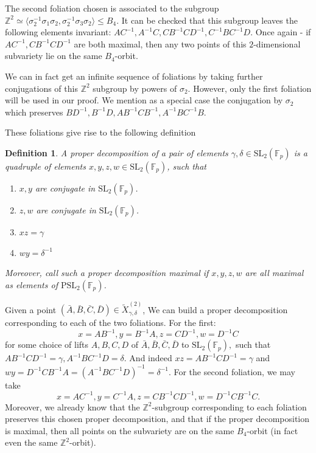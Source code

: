 \documentclass[letterpaper]{amsart}
\newtheorem{definition}[theorem]{Definition}
\begin{document}
The second foliation chosen is associated to the subgroup $\mathbb{Z}^2 \simeq \langle \sigma_2^{-1} \sigma_1 \sigma_2, \sigma_2^{-1} \sigma_3 \sigma_2 \rangle \leq B_4$. It can be checked that this subgroup leaves the following elements invariant: $AC^{-1}, A^{-1}C, CB^{-1}CD^{-1}, C^{-1}BC^{-1}D.$
Once again - if $AC^{-1}, CB^{-1}CD^{-1}$ are both maximal, then any two points of this $2$-dimensional subvariety lie on the same $B_4$-orbit.

We can in fact get an infinite sequence of foliations by taking further conjugations of this $\mathbb{Z}^2$ subgroup by powers of $\sigma_2.$ However, only the first foliation will be used in our proof. We mention as a special case the conjugation by $\sigma_2$ which preserves $BD^{-1}, B^{-1}D, AB^{-1}CB^{-1}, A^{-1}BC^{-1}B$.

These foliations give rise to the following definition
\begin{definition}
\label{proper decomposition definition}
    A proper decomposition of a pair of elements $\gamma, \delta \in \mathrm{SL}_2(\mathbb{F}_p)$ is a quadruple of elements $x, y, z, w \in \mathrm{SL}_2(\mathbb{F}_p)$, such that
    \begin{enumerate}
        \item $x,y$ are conjugate in $\mathrm{SL}_2(\mathbb{F}_p)$.
        \item $z,w$ are conjugate in $\mathrm{SL}_2(\mathbb{F}_p)$.
        \item $xz = \gamma$
        \item $wy = \delta^{-1}$
    \end{enumerate}
Moreover, call such a proper decomposition maximal if $x,y,z,w$ are all maximal as elements of $\mathrm{PSL}_2(\mathbb{F}_p)$.
\end{definition}
Given a point $(\bar{A},\bar{B},\bar{C},\bar{D}) \in \tilde{X}^{(2)}_{\gamma, \delta}$, We can build a proper decomposition corresponding to each of the two foliations. For the first:
$$x = AB^{-1}, y = B^{-1}A, z = CD^{-1}, w = D^{-1}C$$
for some choice of lifts $A,B,C,D$ of $\bar{A},\bar{B},\bar{C},\bar{D}$ to $\mathrm{SL}_2(\mathbb{F}_p),$ such that $AB^{-1}CD^{-1} = \gamma, A^{-1}BC^{-1}D = \delta.$
And indeed $xz = AB^{-1}CD^{-1} = \gamma$ and $wy = D^{-1}CB^{-1}A = (A^{-1}BC^{-1}D)^{-1} = \delta^{-1}$.
For the second foliation, we may take
$$x = AC^{-1}, y = C^{-1}A, z = CB^{-1}CD^{-1}, w = D^{-1}CB^{-1}C.$$
Moreover, we already know that the $\mathbb{Z}^2$-subgroup corresponding to each foliation preserves this chosen proper decomposition, and that if the proper decomposition is maximal, then all points on the subvariety are on the same $B_4$-orbit (in fact even the same $\mathbb{Z}^2$-orbit).
\end{document}
